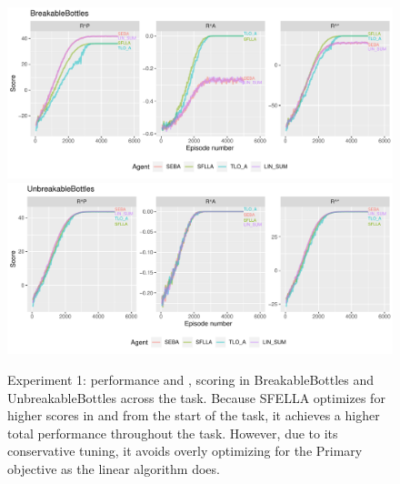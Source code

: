 \begin{figure}

  \includegraphics[width=\columnwidth]{output/multirun_n100_eeba_rolf_default_scale_progress_BreakableBottles.pdf}
  \includegraphics[width=\columnwidth]{output/multirun_n100_eeba_rolf_default_scale_progress_UnbreakableBottles.pdf}
  \caption{Experiment 1: \RStar{} performance and \RP{}, \RA{} scoring in BreakableBottles and UnbreakableBottles across the task. Because SFELLA optimizes for higher scores in \RP{} and \RA{} from the start of the task, it achieves a higher total \RStar{} performance throughout the task. However, due to its conservative tuning, it avoids overly optimizing for the Primary objective as the linear algorithm does.
  }
   \label{fig:bb_performance}
 \end{figure}



 
